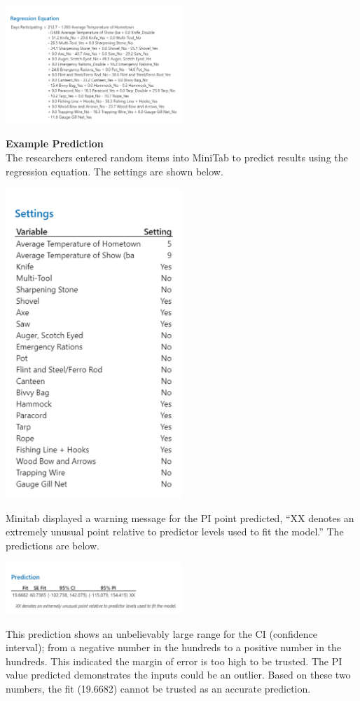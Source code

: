 \documentclass[letterpaper,twoside,11pt,twocolumn]{article}
\begin{document}
\noindent\includegraphics[width=0.5\textwidth]{./img3.png}

\noindent\textbf{Example Prediction}\\
The researchers entered random items into MiniTab to predict results using the regression equation. The settings are shown below.

\noindent\includegraphics[width=0.5\textwidth]{./img4.png}

Minitab displayed a warning message for the PI point predicted, “XX denotes an extremely unusual point relative to predictor levels used to fit the model.” The predictions are below.

\noindent\includegraphics[width=0.5\textwidth]{./img5.png}

This prediction shows an unbelievably large range for the CI (confidence interval); from a negative number in the hundreds to a positive number in the hundreds. This indicated the margin of error is too high to be trusted. The PI value predicted demonstrates the inputs could be an outlier. Based on these two numbers, the fit (19.6682) cannot be trusted as an accurate prediction.
\end{document}

